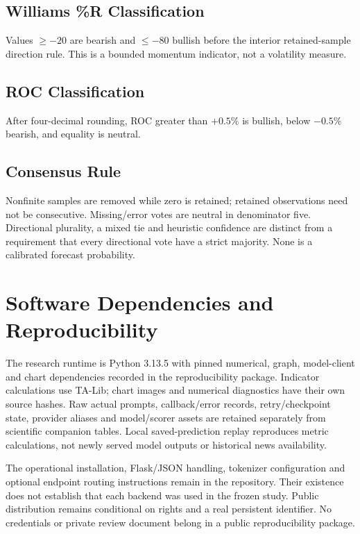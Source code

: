 \subsection{Williams \%R Classification}
Values $\ge-20$ are bearish and $\le-80$ bullish before the interior retained-sample direction rule. This is a bounded momentum indicator, not a volatility measure.
\subsection{ROC Classification}
After four-decimal rounding, ROC greater than $+0.5\%$ is bullish, below $-0.5\%$ bearish, and equality is neutral.
\subsection{Consensus Rule}
Nonfinite samples are removed while zero is retained; retained observations need not be consecutive. Missing/error votes are neutral in denominator five. Directional plurality, a mixed tie and heuristic confidence are distinct from a requirement that every directional vote have a strict majority. None is a calibrated forecast probability.

\FloatBarrier
\section{Software Dependencies and Reproducibility}
\label{app:software}
The research runtime is Python 3.13.5 with pinned numerical, graph, model-client and chart dependencies recorded in the reproducibility package. Indicator calculations use TA-Lib; chart images and numerical diagnostics have their own source hashes. Raw actual prompts, callback/error records, retry/checkpoint state, provider aliases and model/scorer assets are retained separately from scientific companion tables. Local saved-prediction replay reproduces metric calculations, not newly served model outputs or historical news availability.

The operational installation, Flask/JSON handling, tokenizer configuration and optional endpoint routing instructions remain in the repository. Their existence does not establish that each backend was used in the frozen study. Public distribution remains conditional on rights and a real persistent identifier. No credentials or private review document belong in a public reproducibility package.

\FloatBarrier
\clearpage
\setcounter{table}{0}
